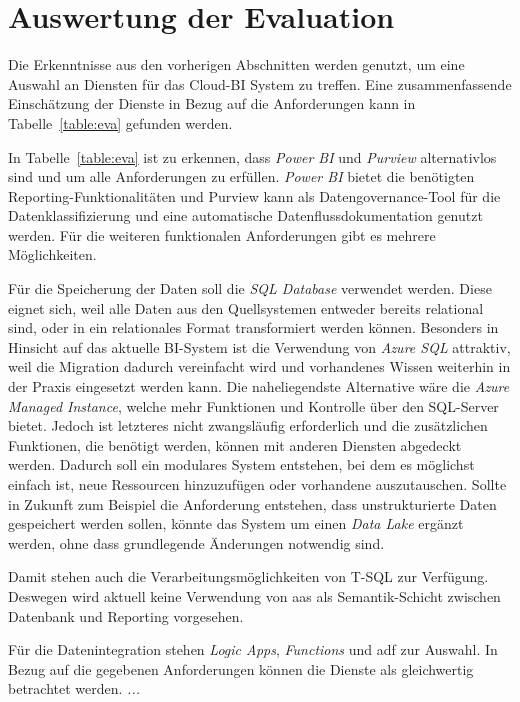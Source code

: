 \section{Auswertung der Evaluation} \label{sec:konzeption:evaAuswertung}
Die Erkenntnisse aus den vorherigen Abschnitten werden genutzt, um eine Auswahl an Diensten für das Cloud-BI System zu treffen. Eine zusammenfassende Einschätzung der Dienste in Bezug auf die Anforderungen kann in Tabelle~\ref{table:eva} gefunden werden.


In Tabelle~\ref{table:eva} ist zu erkennen, dass \textit{Power BI} und \textit{Purview} alternativlos sind und um alle Anforderungen zu erfüllen. \textit{Power BI} bietet die benötigten Reporting-Funktionalitäten und Purview kann als Datengovernance-Tool für die Datenklassifizierung und eine automatische Datenflussdokumentation genutzt werden. Für die weiteren funktionalen Anforderungen gibt es mehrere Möglichkeiten. 

Für die Speicherung der Daten soll die \textit{SQL Database} verwendet werden. Diese eignet sich, weil alle Daten aus den Quellsystemen entweder bereits relational sind, oder in ein relationales Format transformiert werden können. Besonders in Hinsicht auf das aktuelle BI-System ist die Verwendung von \textit{Azure SQL} attraktiv, weil die Migration dadurch vereinfacht wird und vorhandenes Wissen weiterhin in der Praxis eingesetzt werden kann. Die naheliegendste Alternative wäre die \textit{Azure Managed Instance}, welche mehr Funktionen und Kontrolle über den SQL-Server bietet. Jedoch ist letzteres nicht zwangsläufig erforderlich und die zusätzlichen Funktionen, die benötigt werden, können mit anderen Diensten abgedeckt werden. Dadurch soll ein modulares System entstehen, bei dem es möglichst einfach ist, neue Ressourcen hinzuzufügen oder vorhandene auszutauschen. Sollte in Zukunft zum Beispiel die Anforderung entstehen, dass unstrukturierte Daten gespeichert werden sollen, könnte das System um einen \textit{Data Lake} ergänzt werden, ohne dass grundlegende Änderungen notwendig sind.

Damit stehen auch die Verarbeitungsmöglichkeiten von T-SQL zur Verfügung. Deswegen wird aktuell keine Verwendung von \ac{aas} als Semantik-Schicht zwischen Datenbank und Reporting vorgesehen.

Für die Datenintegration stehen \textit{Logic Apps}, \textit{Functions} und \ac{adf} zur Auswahl. In Bezug auf die gegebenen Anforderungen können die Dienste als gleichwertig betrachtet werden. \textit{...}

